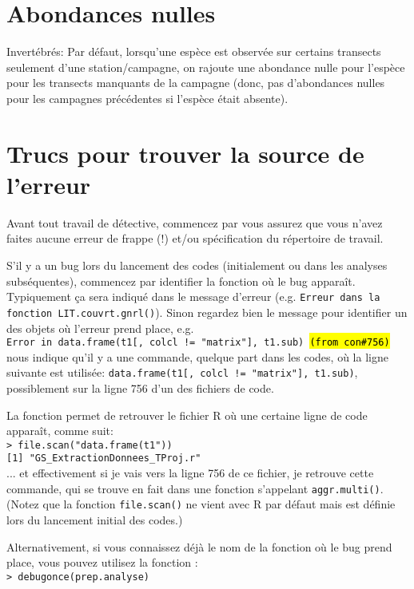 \documentclass{article}
\begin{document}
\section{Abondances nulles}
Invertébrés: Par défaut, lorsqu'une espèce est observée sur certains
transects seulement d'une station/campagne, on rajoute une abondance
nulle pour l'espèce pour les transects manquants de la campagne (donc,
pas d'abondances nulles pour les campagnes précédentes si l'espèce
était absente).

\section{Trucs pour trouver la source de l'erreur}

Avant tout travail de détective, commencez par vous assurez que vous
n'avez faites aucune erreur de frappe (!) et/ou spécification du
répertoire de travail.

S'il y a un bug lors du lancement des codes (initialement ou dans les
analyses subséquentes), commencez par identifier la fonction où le bug
apparaît. Typiquement ça sera indiqué dans le message d'erreur
(e.g. \texttt{Erreur dans la fonction LIT.couvrt.gnrl()}). Sinon
regardez bien le message pour identifier un des objets où l'erreur
prend place, e.g. \\

\texttt{Error in data.frame(t1[, colcl != "matrix"], t1.sub)
\hl{(from con\#756)}}\\

nous indique qu'il y a une commande, quelque part dans les codes, où
la ligne suivante est utilisée: \texttt{data.frame(t1[, colcl !=
  "matrix"], t1.sub)}, possiblement sur la ligne 756 d'un des fichiers
de code.

La fonction  permet de retrouver le fichier R où
une certaine ligne de code apparaît, comme suit: \\
\texttt{> file.scan("data.frame(t1"))}\\
\texttt{[1] "GS\_ExtractionDonnees\_TProj.r"}\\

... et effectivement si je vais vers la ligne 756 de ce fichier, je
retrouve cette commande, qui se trouve en fait dans une fonction
s'appelant \texttt{aggr.multi()}. (Notez que la fonction \texttt{file.scan()}
ne vient avec R par défaut mais est définie lors du lancement initial
des codes.)

Alternativement, si vous connaissez déjà le nom de la fonction où le
bug prend place, vous pouvez utilisez la fonction
:\\
\texttt{> debugonce(prep.analyse)}\\
\end{document}

